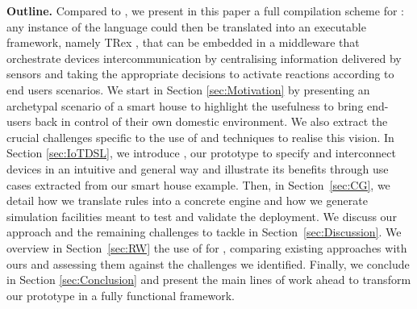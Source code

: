 \noindent
\textbf{Outline.} Compared to \cite{Amrani-Gilson-Debieche-Englebert:2017}, we present in this paper a full compilation scheme for \IOTDSL: any instance of the language could then be translated into an executable framework, namely TRex \cite{cugola-12}, that can be embedded in a middleware that orchestrate devices intercommunication by centralising information delivered by sensors and taking the appropriate decisions to activate reactions according to end users scenarios. 
We start in Section \ref{sec:Motivation} by presenting an archetypal scenario of a smart house to highlight the usefulness to bring end-users back in control of their own domestic \IOT environment. We also extract the crucial \IOT challenges specific to the use of \DSLS and \MDE techniques to realise this vision. In Section \ref{sec:IoTDSL}, we introduce \IOTDSL, our prototype \DSL to specify and interconnect devices in an intuitive and general way and illustrate its benefits through use cases extracted from our smart house example. Then, in Section~\ref{sec:CG}, we detail how we translate \IOTDSL rules into a concrete \CEP engine and how we generate simulation facilities meant to test and validate the \IOT deployment. We discuss our approach and the remaining challenges to tackle in Section~\ref{sec:Discussion}. We overview in Section~\ref{sec:RW} the use of \DSLS for \IOT, comparing existing approaches with ours and assessing them against the challenges we identified. Finally, we conclude in Section \ref{sec:Conclusion} and present the main lines of work ahead to transform our prototype in a fully functional \DSL framework.
